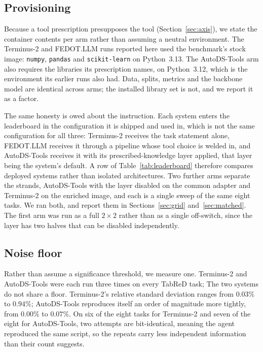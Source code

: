 \subsection{Provisioning}

Because a tool prescription presupposes the tool (Section~\ref{sec:axis}), we
state the container contents per arm rather than assuming a neutral environment.
The Terminus-2 and FEDOT.LLM runs reported here used the benchmark's stock image:
\texttt{numpy}, \texttt{pandas} and \texttt{scikit-learn} on Python~3.13. The
AutoDS-Tools arm also requires the libraries its prescription names, on
Python~3.12, which is the environment its earlier runs also had. Data, splits,
metrics and the backbone model are identical across arms; the installed library
set is not, and we report it as a factor.

The same honesty is owed about the instruction. Each system enters the
leaderboard in the configuration it is shipped and used in, which is
not the same configuration for all three: Terminus-2 receives the task statement
alone, FEDOT.LLM receives it through a pipeline whose tool choice is welded in,
and AutoDS-Tools receives it with its prescribed-knowledge layer applied, that
layer being the system's default. A row of Table~\ref{tab:leaderboard} therefore
compares deployed systems rather than isolated architectures. Two further arms
separate the strands, AutoDS-Tools with the layer disabled on the common
adapter and Terminus-2 on the enriched image, and each is a single sweep of
the same eight tasks. We ran both, and report them in
Sections~\ref{sec:grid} and~\ref{sec:matched}. The first arm was run as a full
$2\times2$ rather than as a single off-switch, since the layer has two halves
that can be disabled independently.

\subsection{Noise floor}

Rather than assume a significance threshold, we measure one. Terminus-2 and
AutoDS-Tools were each run three times on every TabReD task;
The two systems do not share a floor.
Terminus-2's relative standard deviation ranges from $0.03\%$ to $0.94\%$;
AutoDS-Tools reproduces itself an order of magnitude more tightly, from $0.00\%$
to $0.07\%$. On six of the eight tasks for Terminus-2 and seven of the eight for
AutoDS-Tools, two attempts are bit-identical, meaning the agent reproduced the
same script, so the repeats carry less independent information than their count
suggests.

